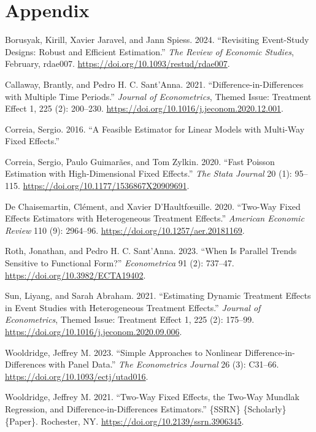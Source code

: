 \documentclass[
  letterpaper,
  DIV=11,
  numbers=noendperiod]{scrartcl}
\newlength{\cslhangindent}
\newenvironment{CSLReferences}[2] %
 {\begin{list}{}{%
  \setlength{\itemindent}{0pt}
  \setlength{\leftmargin}{0pt}
  \setlength{\parsep}{0pt}
  \ifodd #1
   \setlength{\leftmargin}{\cslhangindent}
   \setlength{\itemindent}{-1\cslhangindent}
  \fi
  \setlength{\itemsep}{#2\baselineskip}}}
 {\end{list}}
\begin{document}
\section{Appendix}\label{appendix}

\label{refs}
\begin{CSLReferences}{1}{0}
Borusyak, Kirill, Xavier Jaravel, and Jann Spiess. 2024. {``{Revisiting
Event-Study Designs: Robust and Efficient Estimation}.''} \emph{The
Review of Economic Studies}, February, rdae007.
\url{https://doi.org/10.1093/restud/rdae007}.

Callaway, Brantly, and Pedro H. C. Sant'Anna. 2021.
{``Difference-in-{Differences} with Multiple Time Periods.''}
\emph{Journal of Econometrics}, Themed {Issue}: {Treatment} {Effect} 1,
225 (2): 200--230. \url{https://doi.org/10.1016/j.jeconom.2020.12.001}.

Correia, Sergio. 2016. {``A {Feasible} {Estimator} for {Linear} {Models}
with {Multi}-{Way} {Fixed} {Effects}.''}

Correia, Sergio, Paulo Guimarães, and Tom Zylkin. 2020. {``Fast
{Poisson} Estimation with High-Dimensional Fixed Effects.''} \emph{The
Stata Journal} 20 (1): 95--115.
\url{https://doi.org/10.1177/1536867X20909691}.

De Chaisemartin, Clément, and Xavier D'Haultfœuille. 2020. {``Two-{Way}
{Fixed} {Effects} {Estimators} with {Heterogeneous} {Treatment}
{Effects}.''} \emph{American Economic Review} 110 (9): 2964--96.
\url{https://doi.org/10.1257/aer.20181169}.

Roth, Jonathan, and Pedro H. C. Sant'Anna. 2023. {``When {Is} {Parallel}
{Trends} {Sensitive} to {Functional} {Form}?''} \emph{Econometrica} 91
(2): 737--47. \url{https://doi.org/10.3982/ECTA19402}.

Sun, Liyang, and Sarah Abraham. 2021. {``Estimating Dynamic Treatment
Effects in Event Studies with Heterogeneous Treatment Effects.''}
\emph{Journal of Econometrics}, Themed {Issue}: {Treatment} {Effect} 1,
225 (2): 175--99. \url{https://doi.org/10.1016/j.jeconom.2020.09.006}.

Wooldridge, Jeffrey M. 2023. {``Simple Approaches to Nonlinear
Difference-in-Differences with Panel Data.''} \emph{The Econometrics
Journal} 26 (3): C31--66. \url{https://doi.org/10.1093/ectj/utad016}.

Wooldridge, Jeffrey M. 2021. {``Two-{Way} {Fixed} {Effects}, the
{Two}-{Way} {Mundlak} {Regression}, and {Difference}-in-{Differences}
{Estimators}.''} \{SSRN\} \{Scholarly\} \{Paper\}. Rochester, NY.
\url{https://doi.org/10.2139/ssrn.3906345}.

\end{CSLReferences}
\end{document}
